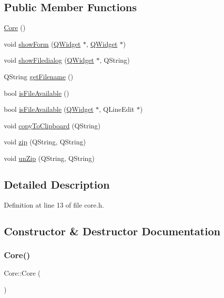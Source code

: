 \subsection*{Public Member Functions}
\begin{DoxyCompactItemize}
\item 
\hyperlink{class_core_a14e63188e0aa7c4a6f72d5501384d1f9}{Core} ()
\item 
void \hyperlink{class_core_ad3503f8f37ca8f8f31bbdefb273a9f78}{show\+Form} (\hyperlink{class_q_widget}{Q\+Widget} $\ast$, \hyperlink{class_q_widget}{Q\+Widget} $\ast$)
\item 
void \hyperlink{class_core_adf62d4f996b0cb94dba269110b136dc1}{show\+Filedialog} (\hyperlink{class_q_widget}{Q\+Widget} $\ast$, Q\+String)
\item 
Q\+String \hyperlink{class_core_aa75cf5dbf2f48a261a8596c42cf99946}{get\+Filename} ()
\item 
bool \hyperlink{class_core_a97c1ce83217497c5000ab5454628b7b2}{is\+File\+Available} ()
\item 
bool \hyperlink{class_core_a87e3e55dfb83db550283f160a5f9fd76}{is\+File\+Available} (\hyperlink{class_q_widget}{Q\+Widget} $\ast$, Q\+Line\+Edit $\ast$)
\item 
void \hyperlink{class_core_a3f943c730fb3d550dd4d7f82667beebb}{copy\+To\+Clipboard} (Q\+String)
\item 
void \hyperlink{class_core_aa48d61e2fd30740e21ff228b8ee54dc1}{zip} (Q\+String, Q\+String)
\item 
void \hyperlink{class_core_a76ef88295ccbf20180de6273a2d387bc}{un\+Zip} (Q\+String, Q\+String)
\end{DoxyCompactItemize}


\subsection{Detailed Description}


Definition at line 13 of file core.\+h.



\subsection{Constructor \& Destructor Documentation}
\hypertarget{class_core_a14e63188e0aa7c4a6f72d5501384d1f9}{}\label{class_core_a14e63188e0aa7c4a6f72d5501384d1f9} 
\subsubsection{\texorpdfstring{Core()}{Core()}}
{\footnotesize\ttfamily Core\+::\+Core (\begin{DoxyParamCaption}{ }\end{DoxyParamCaption})}




